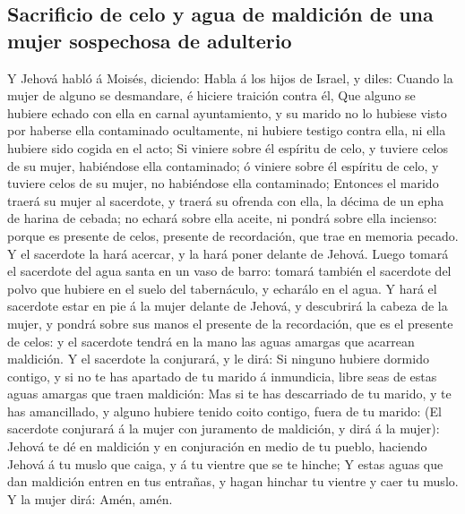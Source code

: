 \hypertarget{sacrificio-de-celo-y-agua-de-maldiciuxf3n-de-una-mujer-sospechosa-de-adulterio}{%
\subsection{Sacrificio de celo y agua de maldición de una mujer
sospechosa de
adulterio}\label{sacrificio-de-celo-y-agua-de-maldiciuxf3n-de-una-mujer-sospechosa-de-adulterio}}

 Y Jehová habló á Moisés, diciendo:  Habla á
los hijos de Israel, y diles: Cuando la mujer de alguno se desmandare, é
hiciere traición contra él,  Que alguno se hubiere echado
con ella en carnal ayuntamiento, y su marido no lo hubiese visto por
haberse ella contaminado ocultamente, ni hubiere testigo contra ella, ni
ella hubiere sido cogida en el acto;  Si viniere sobre él
espíritu de celo, y tuviere celos de su mujer, habiéndose ella
contaminado; ó viniere sobre él espíritu de celo, y tuviere celos de su
mujer, no habiéndose ella contaminado;  Entonces el marido
traerá su mujer al sacerdote, y traerá su ofrenda con ella, la décima de
un epha de harina de cebada; no echará sobre ella aceite, ni pondrá
sobre ella incienso: porque es presente de celos, presente de
recordación, que trae en memoria pecado.  Y el sacerdote la
hará acercar, y la hará poner delante de Jehová.  Luego
tomará el sacerdote del agua santa en un vaso de barro: tomará también
el sacerdote del polvo que hubiere en el suelo del tabernáculo, y
echarálo en el agua.  Y hará el sacerdote estar en pie á la
mujer delante de Jehová, y descubrirá la cabeza de la mujer, y pondrá
sobre sus manos el presente de la recordación, que es el presente de
celos: y el sacerdote tendrá en la mano las aguas amargas que acarrean
maldición.  Y el sacerdote la conjurará, y le dirá: Si
ninguno hubiere dormido contigo, y si no te has apartado de tu marido á
inmundicia, libre seas de estas aguas amargas que traen maldición:
 Mas si te has descarriado de tu marido, y te has
amancillado, y alguno hubiere tenido coito contigo, fuera de tu marido:
 (El sacerdote conjurará á la mujer con juramento de
maldición, y dirá á la mujer): Jehová te dé en maldición y en
conjuración en medio de tu pueblo, haciendo Jehová á tu muslo que caiga,
y á tu vientre que se te hinche;  Y estas aguas que dan
maldición entren en tus entrañas, y hagan hinchar tu vientre y caer tu
muslo. Y la mujer dirá: Amén, amén.

